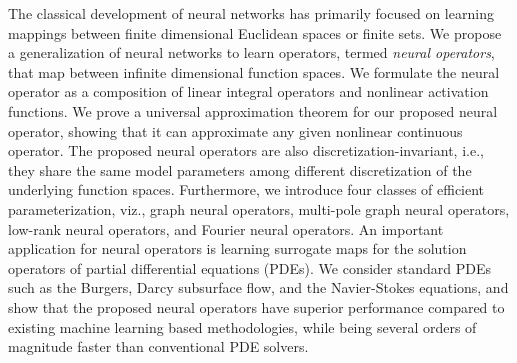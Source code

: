 

The classical development of neural networks has primarily focused on learning mappings between finite dimensional Euclidean spaces or finite sets.
We propose a generalization of neural networks to learn operators, termed \emph{neural operators}, that map between infinite dimensional function spaces.
We formulate the neural operator as a composition of  linear integral operators and nonlinear activation functions. We prove a universal approximation theorem for our proposed neural operator, showing that it can approximate any given nonlinear continuous operator. The proposed neural operators are also discretization-invariant, i.e., they share the same model parameters among different discretization of the underlying function spaces. 
Furthermore, we introduce four classes of efficient parameterization, viz., graph neural operators,  multi-pole graph neural operators, low-rank neural operators, and Fourier neural operators.
An important application for neural operators is learning surrogate maps for the solution operators of
partial differential equations (PDEs). We consider standard PDEs such as the Burgers, Darcy subsurface flow, and the Navier-Stokes equations, and show that the proposed neural operators have superior performance compared to existing machine learning based methodologies,
while being several orders of magnitude faster than conventional PDE solvers. 




